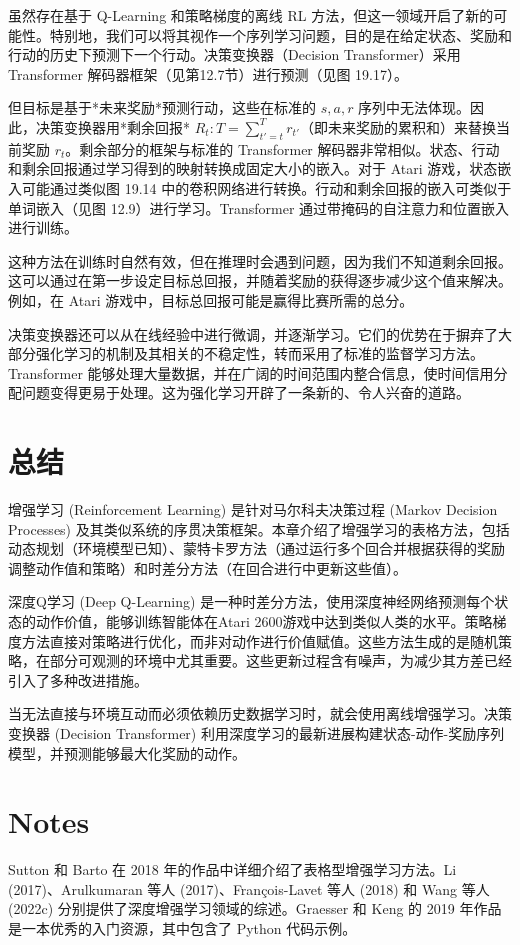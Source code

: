虽然存在基于 Q-Learning 和策略梯度的离线 RL 方法，但这一领域开启了新的可能性。特别地，我们可以将其视作一个序列学习问题，目的是在给定状态、奖励和行动的历史下预测下一个行动。决策变换器（Decision Transformer）采用 Transformer 解码器框架（见第12.7节）进行预测（见图 19.17）。

但目标是基于*未来奖励*预测行动，这些在标准的 \(s, a, r\) 序列中无法体现。因此，决策变换器用*剩余回报* \(R_t:T = \sum_{t'=t}^T r_{t'}\)（即未来奖励的累积和）来替换当前奖励 \(r_t\)。剩余部分的框架与标准的 Transformer 解码器非常相似。状态、行动和剩余回报通过学习得到的映射转换成固定大小的嵌入。对于 Atari 游戏，状态嵌入可能通过类似图 19.14 中的卷积网络进行转换。行动和剩余回报的嵌入可类似于单词嵌入（见图 12.9）进行学习。Transformer 通过带掩码的自注意力和位置嵌入进行训练。

这种方法在训练时自然有效，但在推理时会遇到问题，因为我们不知道剩余回报。这可以通过在第一步设定目标总回报，并随着奖励的获得逐步减少这个值来解决。例如，在 Atari 游戏中，目标总回报可能是赢得比赛所需的总分。

决策变换器还可以从在线经验中进行微调，并逐渐学习。它们的优势在于摒弃了大部分强化学习的机制及其相关的不稳定性，转而采用了标准的监督学习方法。Transformer 能够处理大量数据，并在广阔的时间范围内整合信息，使时间信用分配问题变得更易于处理。这为强化学习开辟了一条新的、令人兴奋的道路。

\section{总结}
增强学习 (Reinforcement Learning) 是针对马尔科夫决策过程 (Markov Decision Processes) 及其类似系统的序贯决策框架。本章介绍了增强学习的表格方法，包括动态规划（环境模型已知）、蒙特卡罗方法（通过运行多个回合并根据获得的奖励调整动作值和策略）和时差分方法（在回合进行中更新这些值）。

深度Q学习 (Deep Q-Learning) 是一种时差分方法，使用深度神经网络预测每个状态的动作价值，能够训练智能体在Atari 2600游戏中达到类似人类的水平。策略梯度方法直接对策略进行优化，而非对动作进行价值赋值。这些方法生成的是随机策略，在部分可观测的环境中尤其重要。这些更新过程含有噪声，为减少其方差已经引入了多种改进措施。

当无法直接与环境互动而必须依赖历史数据学习时，就会使用离线增强学习。决策变换器 (Decision Transformer) 利用深度学习的最新进展构建状态-动作-奖励序列模型，并预测能够最大化奖励的动作。


\section{Notes}
Sutton 和 Barto 在 2018 年的作品中详细介绍了表格型增强学习方法。Li (2017)、Arulkumaran 等人 (2017)、François-Lavet 等人 (2018) 和 Wang 等人 (2022c) 分别提供了深度增强学习领域的综述。Graesser 和 Keng 的 2019 年作品是一本优秀的入门资源，其中包含了 Python 代码示例。

